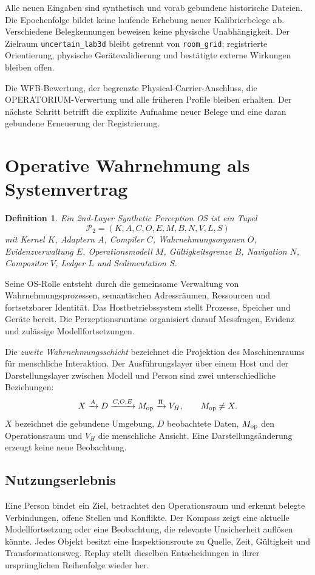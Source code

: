 \documentclass[11pt,a4paper]{article}
\newcommand{\nextsection}[2]{\clearpage{\color{accent}\small\textsf{#1}}\section{#2}}
\newtheorem{definition}[proposition]{Definition}
\begin{document}
Alle neuen Eingaben sind synthetisch und vorab gebundene historische
Dateien. Die Epochenfolge bildet keine laufende Erhebung neuer
Kalibrierbelege ab. Verschiedene Belegkennungen beweisen keine
physische Unabhängigkeit. Der Zielraum \texttt{uncertain\_lab3d}
bleibt getrennt von \texttt{room\_grid}; registrierte Orientierung,
physische Gerätevalidierung und bestätigte externe Wirkungen bleiben offen.

Die WFB-Bewertung, der begrenzte Physical-Carrier-Anschluss,
die OPERATORIUM-Verwertung und alle früheren Profile bleiben erhalten.
Der nächste Schritt betrifft die explizite Aufnahme neuer Belege
und eine daran gebundene Erneuerung der Registrierung.

\clearpage{\footnotesize\linespread{0.9}\selectfont\setlength{\parskip}{0pt}\tableofcontents}\clearpage{}

\nextsection{01 / ZIELIDENTITÄT}{Operative Wahrnehmung als Systemvertrag}
\begin{definition}
Ein 2nd-Layer Synthetic Perception OS ist ein Tupel
\[
\mathcal P_2=(K,A,C,O,E,M,B,N,V,L,S)
\]
mit Kernel $K$, Adaptern $A$, Compiler $C$, Wahrnehmungsorganen $O$,
Evidenzverwaltung $E$, Operationsmodell $M$, Gültigkeitsgrenze $B$,
Navigation $N$, Compositor $V$, Ledger $L$ und Sedimentation $S$.
\end{definition}

Seine OS-Rolle entsteht durch die gemeinsame Verwaltung von
Wahrnehmungsprozessen, semantischen Adressräumen, Ressourcen und
fortsetzbarer Identität. Das Hostbetriebssystem stellt Prozesse,
Speicher und Geräte bereit. Die Perzeptionsruntime organisiert darauf
Messfragen, Evidenz und zulässige Modellfortsetzungen.

Die \emph{zweite Wahrnehmungsschicht} bezeichnet die Projektion des
Maschinenraums für menschliche Interaktion. Der Ausführungslayer über
einem Host und der Darstellungslayer zwischen Modell und Person sind
zwei unterschiedliche Beziehungen:
\[
X\xrightarrow{A}D\xrightarrow{C,O,E}M_{\rm op}
\xrightarrow{\Pi}V_H,\qquad M_{\rm op}\neq X.
\]
$X$ bezeichnet die gebundene Umgebung, $D$ beobachtete Daten,
$M_{\rm op}$ den Operationsraum und $V_H$ die menschliche Ansicht.
Eine Darstellungsänderung erzeugt keine neue Beobachtung.

\subsection{Nutzungserlebnis}
Eine Person bindet ein Ziel, betrachtet den Operationsraum und erkennt
belegte Verbindungen, offene Stellen und Konflikte. Der Kompass zeigt
eine aktuelle Modellfortsetzung oder eine Beobachtung, die relevante
Unsicherheit auflösen könnte. Jedes Objekt besitzt eine Inspektionsroute
zu Quelle, Zeit, Gültigkeit und Transformationsweg. Replay stellt
dieselben Entscheidungen in ihrer ursprünglichen Reihenfolge wieder her.
\end{document}
